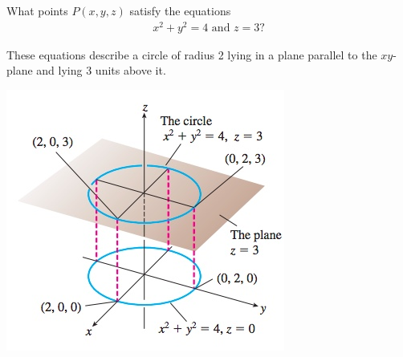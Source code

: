 \documentclass[12pt,letterpaper,reqno]{article}
\numberwithin{equation}{section}
\begin{document}
\begin{exercise}
	What points $P(x,y,z)$ satisfy the equations
	\begin{align*}
		x^2+y^2=4 \text{ and }z=3?
	\end{align*}
\end{exercise}

{\color{red}  These equations describe a circle of radius 2 lying in a plane parallel to the $xy$-plane and lying 3 units above it.}

\begin{center}
	\includegraphics[scale=0.5]{figures_mvc/circle_z=3}
\end{center}
\end{document}
